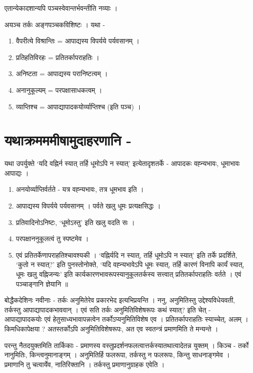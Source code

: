 एतान्येकादशान्यपि पञ्चस्वेवान्तर्भवन्तीति नव्याः ।

अयञ्च तर्कः अङ्गपञ्चकविशिष्टः । यथा - 
\begin{enumerate}
\item	वैपरीत्ये विश्रान्तिः = आपाद्यस्य विपर्यये पर्यवसानम् । 
\item	प्रतिहतिविरहः = प्रतितर्कापराहतिः । 
\item	अनिष्टता  = आपाद्यस्य परानिष्टत्वम् । 
\item	अनानुकूल्यम् = परपक्षासाधकत्वम् । 
\item	व्याप्तिश्च = आपाद्यापादकयोर्व्याप्तिश्च (इति पञ्च) ।
\end{enumerate}

\section*{यथाक्रमममीषामुदाहरणानि -} 

यथा उपर्युक्ते ‘यदि वह्निर्न स्यात् तर्हि धूमोऽपि न स्यात्' इत्येतादृशतर्के -  आपादकः वह्न्यभावः, धूमाभावः आपाद्यः ।
\begin{enumerate}
\item	अनयोर्व्याप्तिर्वर्तते - यत्र वह्न्यभावः, तत्र धूमभाव इति । 
\item	आपाद्यस्य विपर्यये पर्यवसानम् । पर्वते खलु धूमः प्रत्यक्षसिद्धः ।
\item	प्रतिवादिनोऽनिष्टः, ‘धूमोऽस्तु' इति खलु वदति सः । 
\item	परपक्षाननुकूलत्वं तु स्पष्टमेव । 
\item	एवं प्रतितर्केणापराहतिश्चावश्यकी । ‘वह्निर्यदि न स्यात्, तर्हि धूमोऽपि न स्यात्' इति तर्के प्रदर्शिते, ‘कुतो न स्यात्?' इति पुनस्तोनोक्ते, ‘यदि वह्न्यभावेऽपि धूमः स्यात्, तर्हि कारणं विनापि कार्यं स्यात्, धूमः खलु वह्निजन्यः' इति कार्यकारणभावरूपस्यानुकूलतर्कस्य सत्त्वात् प्रतितर्कापराहतिः वर्तते । एवं पञ्चाङ्गानि ज्ञेयानि ॥ 
\end{enumerate}
बोद्धैकदेशिनः नवीनाः  - तर्कः अनुमितेरेव प्रकारभेद इत्यभिप्रयन्ति । ननु, अनुमितिस्तु उद्देश्यविधेयवती, तर्कस्तु आपाद्यापादकभाववान् । एवं सति तर्कः अनुमितिविशेषरूपः कथं स्यात्? इति चेत् - आपाद्यापादकयोः एवं हेतुसाध्यभावापन्नत्वेन तर्कोऽप्यनुमितिविशेष एव । प्रतितर्कापराहतिः स्याच्चेत्, अलम्  । किमधिकापेक्षया ? अतस्तर्कोऽपि अनुमितिविशेषरूपः, अत एव स्वतन्त्रं प्रमाणमिति ते मन्यन्ते । 

परन्तु नैतदयुक्तमिति तार्किकाः - प्रमाणस्य वस्तुप्रदर्शनफलत्वात्तर्कस्यातथात्वादेतन्न युक्तम्  । किञ्च - तर्को नानुमितिः, किन्त्वनुमानाङ्गम् । अनुमितिर्हि फलरूपा, तर्कस्तु न फलरूपः, किन्तु साधनाङ्गमेव । प्रमाणानि तु चत्वार्येव, नातिरिक्तानि । तर्कस्तु प्रमाणानुग्राहक एवेति ।

